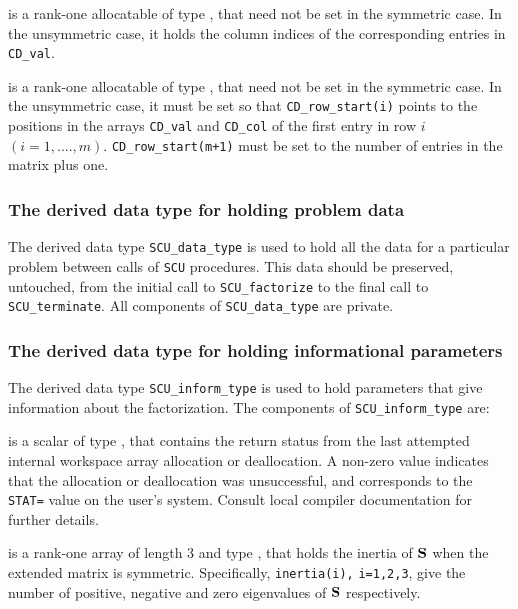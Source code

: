 \documentclass{galahad}
\newcommand{\packagename}{SCU}
\begin{document}
\begin{description}
 is a rank-one allocatable of type \integer, 
that need not be set in the symmetric case. In the unsymmetric case, it holds 
the column indices of the corresponding entries in {\tt CD\_val}. 
 
 is a rank-one allocatable of type \integer, 
that need not be set in the symmetric case. In the unsymmetric case, it  
must be set so that {\tt CD\_row\_start(i)} points to the  
positions in the arrays {\tt CD\_val} and {\tt CD\_col} of the first entry in 
row $i$ $(i = 1, ...., m)$. {\tt CD\_row\_start(m+1)} must be set to 
the number of entries in the matrix  plus one. 
 
\end{description}


\subsubsection{The derived data type for holding problem data}\label{typedata}
The derived data type 
{\tt \packagename\_data\_type} 
is used to hold all the data for a particular problem between calls of 
{\tt \packagename} procedures. 
This data should be preserved, untouched, from the initial call to 
{\tt \packagename\_factorize}
to the final call to
{\tt \packagename\_terminate}.
All components of {\tt \packagename\_data\_type} are private.


\subsubsection{The derived data type for holding informational
 parameters}\label{typeinfo}
The derived data type 
{\tt \packagename\_inform\_type} 
is used to hold parameters that give information about the factorization.
The components of
{\tt \packagename\_inform\_type} 
are:

\begin{description}
 is a scalar of type \integer, that contains 
the return status from the last attempted internal  
workspace array allocation or deallocation. 
A non-zero value indicates that the allocation or deallocation was
 unsuccessful, and corresponds to the {\tt STAT=} value on the user's system. 
Consult local compiler documentation for further details. 
 
 is a rank-one array of length 3 and type \integer, 
that holds the inertia of ${\mathbf{S}}$ when the extended matrix is symmetric. 
Specifically, {\tt inertia(i),} {\tt i=1,2,3},  
give the number of positive, negative and zero eigenvalues of  
${\mathbf{S}}$ respectively. 
 
\end{description}
\end{document}
